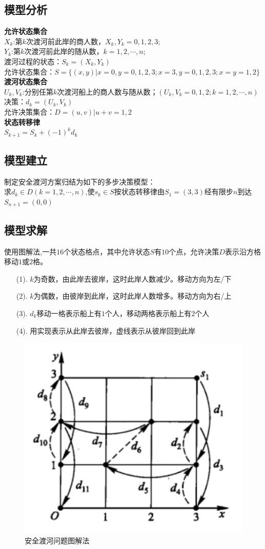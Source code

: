 \documentclass[openany]{progbookcn}
\begin{document}
\subsection{模型分析}
\noindent \textbf{允许状态集合}\\
\indent $X_k$:第$k$次渡河前此岸的商人数，$X_k,Y_k=0,1,2,3$;\\
\indent $Y_k$:第$k$次渡河前此岸的随从数，$k=1,2,\cdots,n$;\\
\indent 渡河过程的状态：$S_k=(X_k,Y_k)$\\
\indent 允许状态集合：$S=\{(x,y)|x=0,y=0,1,2,3;x=3,y=0,1,2,3;x=y=1,2\}$\\
\textbf{渡河状态集合}\\
\indent $U_k,V_k$:分别任第$k$次渡河船上的商人数与随从数；$(U_k,V_k=0,1,2;k=1,2,\cdots,n)$\\
\indent 决策：$d_k=(U_k,V_k)$\\
\indent 允许决策集合：$D={(u,v)|u+v=1,2}$\\
\textbf {状态转移律}\\
\indent $S_{k+1}=S_k+(-1)^k d_k$
\subsection{模型建立}
制定安全渡河方案归结为如下的多步决策模型：\\
\indent 求$d_k\in D(k=1,2,\cdots,n)$,使$s_k\in S$按状态转移律由$S_1=(3,3)$经有限步$n$到达$S_{n+1}=(0,0)$
\subsection{模型求解}
使用图解法,一共$16$个状态格点，其中允许状态$S$有$10$个点，允许决策$D$表示沿方格移动$1$或$2$格。
\begin{enumerate}[itemindent=2em]
\item [(1).]$k$为奇数，由此岸去彼岸，这时此岸人数减少。移动方向为左/下
\item [(2).]$k$为偶数，由彼岸到此岸，这时此岸人数增多。移动方向为右/上
\item [(3).]$d_k$移动一格表示船上有$1$个人，移动两格表示船上有$2$个人
\item [(4).]用实现表示从此岸去彼岸，虚线表示从彼岸回到此岸
\end{enumerate}
\begin{figure}[H]
\centering
\includegraphics[width=0.45 \textwidth]{figs/chapter3/安全渡河问题图解法}
\caption{安全渡河问题图解法}
\end{figure}
\end{document}
